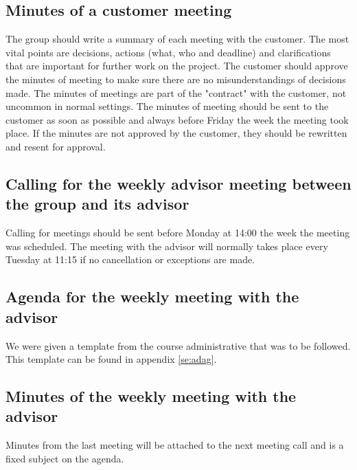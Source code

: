 \newpage

\subsection{Minutes of a customer meeting}
The group should write a summary of each meeting with the customer. The most vital points are decisions, actions (what, who and deadline) and clarifications that are important for further work on the project. The customer should approve the minutes of meeting to make sure there are no misunderstandings of decisions made. The minutes of meetings are part of the "contract" with the customer, not uncommon in normal settings.
\newline
\newline
The minutes of meeting should be sent to the customer as soon as possible and always before Friday the week the meeting took place. If the minutes are not approved by the customer, they should be rewritten and resent for approval.

\subsection{Calling for the weekly advisor meeting between the group and its advisor}
Calling for meetings should be sent before Monday at 14:00 the week the meeting was scheduled. The meeting with the advisor will normally takes place every Tuesday at 11:15 if no cancellation or exceptions are made.

\subsection{Agenda for the weekly meeting with the advisor}
We were given a template from the course administrative that was to be followed. This template can be found in appendix \ref{se:adag}.

\subsection{Minutes of the weekly meeting with the advisor}
Minutes from the last meeting will be attached to the next meeting call and is a fixed subject on the agenda.


